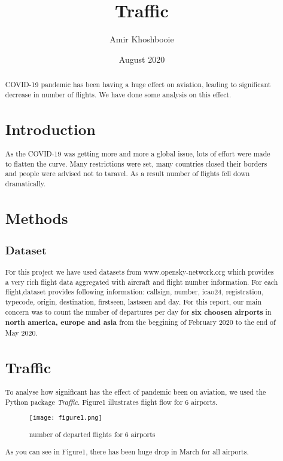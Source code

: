 \documentclass[12pt, a4paper]{article}
\title{Traffic}
\author{Amir Khoshbooie}
\date{August 2020}
\begin{document}
\begin{abstract}
COVID-19 pandemic has been having a huge effect on aviation, leading to significant decrease in number of flights. We have done some analysis on this effect.

\maketitle

\section{Introduction}
As the COVID-19 was getting more and more a global issue, lots of effort were made to flatten the curve. Many restrictions were set, many countries closed their borders and people were advised not to taravel. As a result number of flights fell down dramatically.


\section{Methods}

\subsection{Dataset}

For this project we have used datasets from www.opensky-network.org  which provides a very rich flight data aggregated with aircraft and flight number information. For each flight,dataset provides following information: callsign, number, icao24, registration, typecode, origin, destination, firstseen, lastseen and day. For this report, our main concern was to count the number of departures per day for \textbf{six choosen airports} in \textbf{north america, europe and asia} from the beggining of February 2020 to the end of May 2020.

\section{Traffic}
To analyse how significant has the effect of pandemic been on aviation, we used the Python package \emph{Traffic}.
Figure1 illustrates flight flow for 6 airports.
\newpage
\vfill
\begin{figure}[h]
    \centering
    \texttt{[image: figure1.png]}
    \caption{number of departed flights for 6 airports}
    \label{fig:mesh1}
\end{figure}
\vfill
\clearpage
As you can see in Figure1, there has been huge drop in March for all airports.


\end{abstract}
\end{document}
